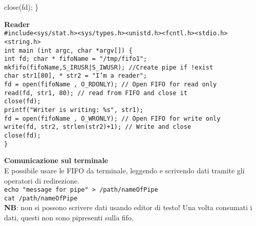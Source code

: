 \begin{flushleft}
\begin{flushleft}
{            \halftab close(fd);
            \}}
  \end{flushleft}
  \begin{flushleft}
    \textbf{Reader}\\
    \texttt{\#include<sys/stat.h><sys/types.h><unistd.h><fcntl.h><stdio.h><string.h>\\
            int main (int argc, char *argv[]) \{\\
            \halftab int fd; char * fifoName = "/tmp/fifo1"; \\
            \halftab mkfifo(fifoName,S\_IRUSR|S\_IWUSR); //Create pipe if !exist\\
            \halftab char str1[80], * str2 = "I'm a reader";\\
            \halftab fd = open(fifoName , O\_RDONLY); // Open FIFO for read only\\
            \halftab read(fd, str1, 80); // read from FIFO and close it\\
            \halftab close(fd);\\
            \halftab printf("Writer is writing: \%s\n", str1);\\
            \halftab fd = open(fifoName , O\_WRONLY); // Open FIFO for write only\\
            \halftab write(fd, str2, strlen(str2)+1); // Write and close\\
            \halftab close(fd);\\
            \} }
  \end{flushleft}
  \begin{flushleft}
    \textbf{Comunicazione sul terminale}\\
    \ac{E} possibile usare le FIFO da terminale, leggendo e scrivendo dati tramite gli 
    operatori di redirezione. \\
    \texttt{echo "message for pipe" > /path/nameOfPipe\\
    cat /path/nameOfPipe}\\
    \textbf{NB}: non si possono scrivere dati usando editor di testo! Una volta consumati i dati, 
    questi non sono pi\acu presenti sulla fifo.
  \end{flushleft}
\end{flushleft}
